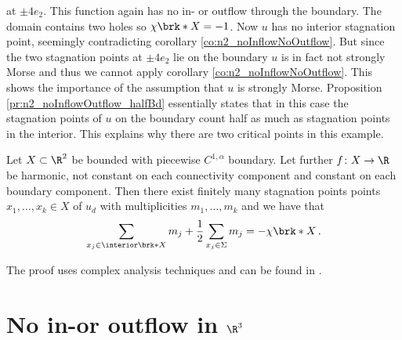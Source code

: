 \begin{example}
  at $\pm4e_2$.
  This function again has no in- or outflow through the boundary. The domain contains
  two holes so $\chi\brk*{X}=-1$. Now $u$ has no interior stagnation point, seemingly contradicting
  corollary \ref{co:n2_noInflowNoOutflow}. But since the two stagnation points
  at $\pm4e_2$ lie on the boundary $u$ is in fact not strongly Morse and thus we cannot apply corollary \ref{co:n2_noInflowNoOutflow}.
  This shows the importance of the assumption that $u$ is strongly Morse.
  Proposition \ref{pr:n2_noInflowOutflow_halfBd}
  essentially states that in this case the stagnation points of $u$ on the boundary
  count half as much as stagnation points in the interior.
  This explains why there are two critical points in this example.
\end{example}

\begin{proposition}\label{pr:n2_noInflowOutflow_halfBd}
  Let $X\subset\R^2$ be bounded with piecewise $C^{1,\alpha}$ boundary.
  Let further $f\colon X\to\R$ be harmonic, not constant on each connectivity component 
  and constant on each boundary component. Then there exist finitely many stagnation points
  points $x_1,\dots,x_k\in X$ of $u_d$ with multiplicities $m_1,\dots,m_k$ and we have that
  \begin{align*}
    \sum_{x_j\in\openX}m_j+\frac{1}{2}\sum_{x_j\in \Sigma}m_j=-\chi\brk*{X}\,.
  \end{align*}
\end{proposition}
  The proof uses complex analysis techniques and can be found in \cite{Alessandrini1992}.

\section{No in-or outflow in $\R^3$}

